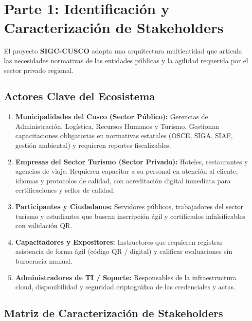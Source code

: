
\section{Parte 1: Identificación y Caracterización de Stakeholders}

El proyecto \textbf{SIGC-CUSCO} adopta una arquitectura multientidad que articula las necesidades normativas de las entidades públicas y la agilidad requerida por el sector privado regional.

\subsection{Actores Clave del Ecosistema}
\begin{enumerate}
    \item \textbf{Municipalidades del Cusco (Sector Público):} Gerencias de Administración, Logística, Recursos Humanos y Turismo. Gestionan capacitaciones obligatorias en normativas estatales (OSCE, SIGA, SIAF, gestión ambiental) y requieren reportes fiscalizables.
    \item \textbf{Empresas del Sector Turismo (Sector Privado):} Hoteles, restaurantes y agencias de viaje. Requieren capacitar a su personal en atención al cliente, idiomas y protocolos de calidad, con acreditación digital inmediata para certificaciones y sellos de calidad.
    \item \textbf{Participantes y Ciudadanos:} Servidores públicos, trabajadores del sector turismo y estudiantes que buscan inscripción ágil y certificados infalsificables con validación QR.
    \item \textbf{Capacitadores y Expositores:} Instructores que requieren registrar asistencia de forma ágil (código QR / digital) y calificar evaluaciones sin burocracia manual.
    \item \textbf{Administradores de TI / Soporte:} Responsables de la infraestructura cloud, disponibilidad y seguridad criptográfica de las credenciales y actas.
\end{enumerate}

\subsection{Matriz de Caracterización de Stakeholders}

